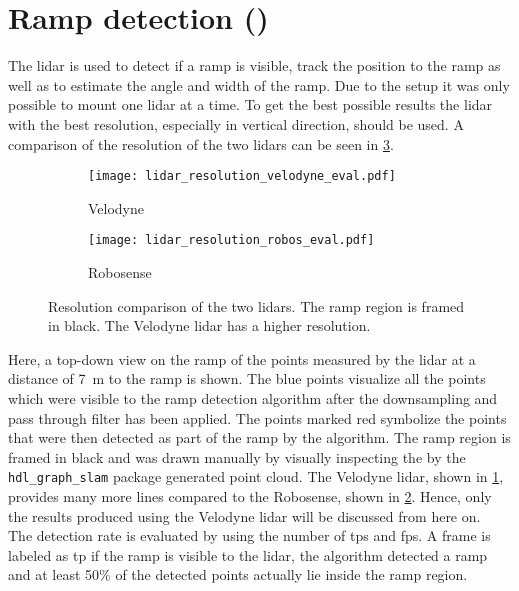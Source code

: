 \section{Ramp detection ()}
The \gls{lidar} is used to detect if a ramp is visible, track the position to the ramp as well as to estimate the angle and width of the ramp.
Due to the setup it was only possible to mount one \gls{lidar} at a time.
To get the best possible results the \gls{lidar} with the best resolution, especially in vertical direction, should be used.
A comparison of the resolution of the two \glspl{lidar} can be seen in \cref{fig:lidar_resolution_eval}.
\begin{figure}[htb]
	\centering
	\begin{subfigure}{1\textwidth}
		\centering
		\texttt{[image: lidar\_resolution\_velodyne\_eval.pdf]}
		\caption{Velodyne}
		\label{fig:lidar_resolution_velodyne_eval}
	\end{subfigure}
	
	\begin{subfigure}{1\textwidth}
		\centering
		\texttt{[image: lidar\_resolution\_robos\_eval.pdf]}
		\caption{Robosense}
		\label{fig:lidar_resolution_robos_eval}
	\end{subfigure}
	\caption{Resolution comparison of the two \glspl{lidar}. The ramp region is framed in black. The Velodyne \gls{lidar} has a higher resolution.}
	\label{fig:lidar_resolution_eval}
\end{figure}
Here, a top-down view on the ramp of the points measured by the \gls{lidar} at a distance of \SI{7}{\metre} to the ramp is shown.
The blue points visualize all the points which were visible to the ramp detection algorithm after the downsampling and pass through filter has been applied.
The points marked red symbolize the points that were then detected as part of the ramp by the algorithm.
The ramp region is framed in black and was drawn manually by visually inspecting the by the \texttt{hdl\_graph\_slam} package generated point cloud.
The Velodyne \gls{lidar}, shown in \cref{fig:lidar_resolution_velodyne_eval}, provides many more lines compared to the Robosense, shown in \cref{fig:lidar_resolution_robos_eval}.
Hence, only the results produced using the Velodyne \gls{lidar} will be discussed from here on.\\
The detection rate is evaluated by using the number of \glspl{tp} and \glspl{fp}.
A frame is labeled as \gls{tp} if the ramp is visible to the \gls{lidar}, the algorithm detected a ramp and at least 50\% of the detected points actually lie inside the ramp region.
